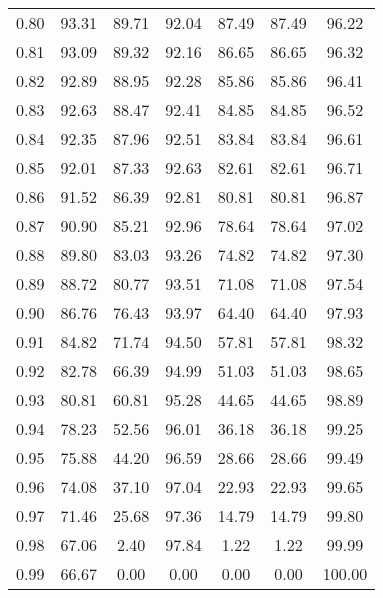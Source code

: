 \begin{tabular}{|c|c|c|c|c|c|c|}
      0.80 &     93.31 &     89.71 &      92.04 &   87.49 &      87.49 &         96.22 \\
      0.81 &     93.09 &     89.32 &      92.16 &   86.65 &      86.65 &         96.32 \\
      0.82 &     92.89 &     88.95 &      92.28 &   85.86 &      85.86 &         96.41 \\
      0.83 &     92.63 &     88.47 &      92.41 &   84.85 &      84.85 &         96.52 \\
      0.84 &     92.35 &     87.96 &      92.51 &   83.84 &      83.84 &         96.61 \\
      0.85 &     92.01 &     87.33 &      92.63 &   82.61 &      82.61 &         96.71 \\
      0.86 &     91.52 &     86.39 &      92.81 &   80.81 &      80.81 &         96.87 \\
      0.87 &     90.90 &     85.21 &      92.96 &   78.64 &      78.64 &         97.02 \\
      0.88 &     89.80 &     83.03 &      93.26 &   74.82 &      74.82 &         97.30 \\
      0.89 &     88.72 &     80.77 &      93.51 &   71.08 &      71.08 &         97.54 \\
      0.90 &     86.76 &     76.43 &      93.97 &   64.40 &      64.40 &         97.93 \\
      0.91 &     84.82 &     71.74 &      94.50 &   57.81 &      57.81 &         98.32 \\
      0.92 &     82.78 &     66.39 &      94.99 &   51.03 &      51.03 &         98.65 \\
      0.93 &     80.81 &     60.81 &      95.28 &   44.65 &      44.65 &         98.89 \\
      0.94 &     78.23 &     52.56 &      96.01 &   36.18 &      36.18 &         99.25 \\
      0.95 &     75.88 &     44.20 &      96.59 &   28.66 &      28.66 &         99.49 \\
      0.96 &     74.08 &     37.10 &      97.04 &   22.93 &      22.93 &         99.65 \\
      0.97 &     71.46 &     25.68 &      97.36 &   14.79 &      14.79 &         99.80 \\
      0.98 &     67.06 &      2.40 &      97.84 &    1.22 &       1.22 &         99.99 \\
      0.99 &     66.67 &      0.00 &       0.00 &    0.00 &       0.00 &        100.00 \\
\bottomrule
\end{tabular}
